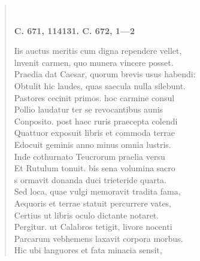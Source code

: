 \documentclass[11pt, a4paper]{report}
\begin{document}
\begin{verse}
        ﻿\pagebreak 
    \begin{center} \textbf{C. 671, 114131. C. 672, 1—2} \end{center} \marginpar{[145]} Iis auctus meritis cum digna rependere vellet, \\ lnvenit carmen, quo munera vincere posset. \\ Praedia dat Caesar, quorum brevis usus habendi: \\ Obtulit hic laudes, quas saecula nulla silebunt. \\ Pastores cecinit primos. hoc carmine consul \\ Pollio laudatur ter se revocantibus aunis \\ Conposito. post haec ruris praecepta colendi \\ Quattuor exposuit libris et commoda terrae \\ Edocuit geminis anno minus omnia lustris. \\ Inde cothurnato Teucrorum praelia versu \\ Et Rutulum tonuit. bis sena volumina sacro \\ s ormavit donanda duci trieteride quarta. \\ Sed loca, quae vulgi memoravit tradita fama, \\ Aequoris et terrae statuit percurrere vates, \\ Certius ut libris oculo dictante notaret. \\ Pergitur. ut Calabros tetigit, livore nocenti \\ Parcarum vebhemens laxavit corpora morbus. \\ Hic ubi languores et fata minacia sensit, \\ 
      \end{verse}
  
\end{document}
